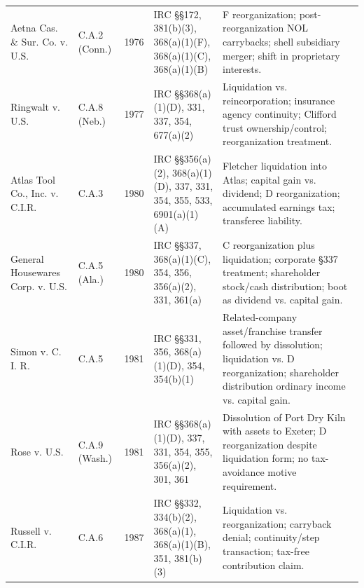 \begin{footnotesize}
\begin{longtable}{p{}p{}p{}p{}p{}}
Aetna Cas. \& Sur. Co. v. U.S. & C.A.2 (Conn.) & 1976 & IRC \S\S 172, 381(b)(3), 368(a)(1)(F), 368(a)(1)(C), 368(a)(1)(B) & F reorganization; post-reorganization NOL carrybacks; shell subsidiary merger; shift in proprietary interests. \\
Ringwalt v. U.S. & C.A.8 (Neb.) & 1977 & IRC \S\S 368(a)(1)(D), 331, 337, 354, 677(a)(2) & Liquidation vs. reincorporation; insurance agency continuity; Clifford trust ownership/control; reorganization treatment. \\
Atlas Tool Co., Inc. v. C.I.R. & C.A.3 & 1980 & IRC \S\S 356(a)(2), 368(a)(1)(D), 337, 331, 354, 355, 533, 6901(a)(1)(A) & Fletcher liquidation into Atlas; capital gain vs. dividend; D reorganization; accumulated earnings tax; transferee liability. \\
General Housewares Corp. v. U.S. & C.A.5 (Ala.) & 1980 & IRC \S\S 337, 368(a)(1)(C), 354, 356, 356(a)(2), 331, 361(a) & C reorganization plus liquidation; corporate \S 337 treatment; shareholder stock/cash distribution; boot as dividend vs. capital gain. \\
Simon v. C. I. R. & C.A.5 & 1981 & IRC \S\S 331, 356, 368(a)(1)(D), 354, 354(b)(1) & Related-company asset/franchise transfer followed by dissolution; liquidation vs. D reorganization; shareholder distribution ordinary income vs. capital gain. \\
Rose v. U.S. & C.A.9 (Wash.) & 1981 & IRC \S\S 368(a)(1)(D), 337, 331, 354, 355, 356(a)(2), 301, 361 & Dissolution of Port Dry Kiln with assets to Exeter; D reorganization despite liquidation form; no tax-avoidance motive requirement. \\
Russell v. C.I.R. & C.A.6 & 1987 & IRC \S\S 332, 334(b)(2), 368(a)(1), 368(a)(1)(B), 351, 381(b)(3) & Liquidation vs. reorganization; carryback denial; continuity/step transaction; tax-free contribution claim. \\
\end{longtable}
\end{footnotesize}
